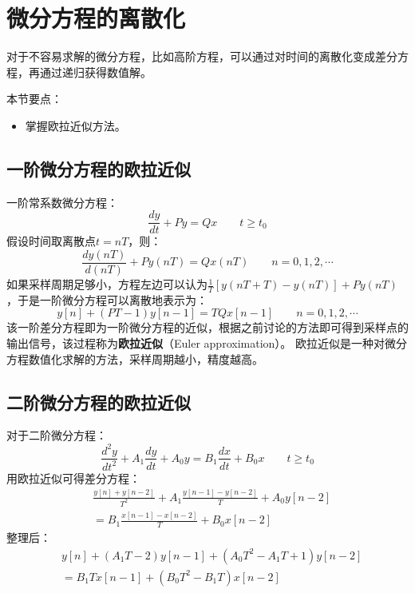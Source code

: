 \section{微分方程的离散化}

对于不容易求解的微分方程，比如高阶方程，可以通过对时间的离散化变成差分方程，再通过递归获得数值解。

本节要点：
\begin{itemize}
    \item 掌握欧拉近似方法。
\end{itemize}

\subsection{一阶微分方程的欧拉近似}

一阶常系数微分方程：
\[
\frac{dy}{dt}+Py=Qx \qquad t\geqslant t_0
\]
假设时间取离散点$t=nT$，则：
\[
\frac{dy\left( nT \right)}{d\left( nT \right)}+Py\left( nT \right) =Qx\left( nT \right) \qquad n=0,1,2,\cdots
\]
如果采样周期足够小，方程左边可以认为$\frac{1}{T}\left[ y\left( nT+T \right) -y\left( nT \right) \right] +Py\left( nT \right) $，于是一阶微分方程可以离散地表示为：
\[
y\left[ n \right] +\left( PT-1 \right) y\left[ n-1 \right] =TQx\left[ n-1 \right] \qquad n=0,1,2,\cdots
\]
该一阶差分方程即为一阶微分方程的近似，根据之前讨论的方法即可得到采样点的输出信号，该过程称为{\bf 欧拉近似}（Euler approximation）。
欧拉近似是一种对微分方程数值化求解的方法，采样周期越小，精度越高。

\subsection{二阶微分方程的欧拉近似}

对于二阶微分方程：
\[
\frac{d^2y}{dt^2}+A_1\frac{dy}{dt}+A_0y=B_1\frac{dx}{dt}+B_0x \qquad t\geqslant t_0
\]
用欧拉近似可得差分方程：
\begin{align*}
&\frac{y\left[ n \right] +y\left[ n-2 \right]}{T^2}+A_1\frac{y\left[ n-1 \right] -y\left[ n-2 \right]}{T}+A_0y\left[ n-2 \right] \\
&=B_1\frac{x\left[ n-1 \right] -x\left[ n-2 \right]}{T}+B_0x\left[ n-2 \right]
\end{align*}
整理后：
\begin{align*}
&y\left[ n \right] +\left( A_1T-2 \right) y\left[ n-1 \right] +\left( A_0T^2-A_1T+1 \right) y\left[ n-2 \right] \\
&=B_1Tx\left[ n-1 \right] +\left( B_0T^2-B_1T \right) x\left[ n-2 \right]
\end{align*}

